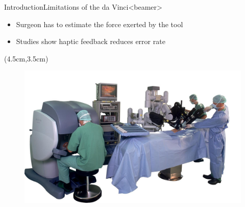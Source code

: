 \begin{frame}{Introduction}{Limitations of the da Vinci}<beamer>
\begin{itemize}
\item Surgeon has to estimate the force exerted by the tool
\item Studies show haptic feedback reduces error rate
\end{itemize}

\begin{textblock*}{0.7\textwidth}(4.5cm,3.5cm) %
  \begin{figure}[H]
  	\centering
  		\centering
  		\includegraphics[width=1\textwidth]{Billeder/Dan/davinci.jpg}
  \end{figure}
\end{textblock*}

\end{frame}

